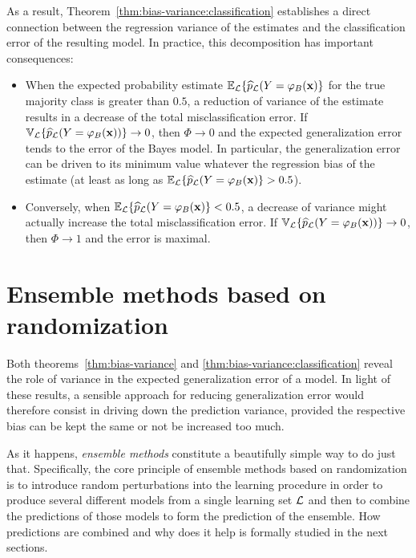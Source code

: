 As a result, Theorem~\ref{thm:bias-variance:classification} establishes a
direct connection between the regression variance of the estimates and the
classification error of the resulting model. In practice, this decomposition
has important consequences:
\begin{itemize}
\item When the expected probability estimate $\mathbb{E}_{\cal L}\{ \widehat{p}_{\cal L}(Y=\varphi_B(\mathbf{x}) \}$
      for the true majority class is greater than $0.5$, a reduction of
      variance of the estimate results in a decrease of the total misclassification
      error. If $\mathbb{V}_{\cal L}\{ \widehat{p}_{\cal L}(Y=\varphi_B(\mathbf{x})) \} \to 0$,
      then $\Phi \to 0$ and the expected generalization error tends to the error of the Bayes model.
      In particular, the generalization error can be driven to its minimum
      value whatever the regression bias of the estimate (at least as long as $\mathbb{E}_{\cal L}\{ \widehat{p}_{\cal L}(Y=\varphi_B(\mathbf{x}) \} > 0.5$).
\item Conversely, when $\mathbb{E}_{\cal L}\{ \widehat{p}_{\cal L}(Y=\varphi_B(\mathbf{x}) \} < 0.5$,
      a decrease of variance might actually increase the total misclassification error.
      If $\mathbb{V}_{\cal L}\{ \widehat{p}_{\cal L}(Y=\varphi_B(\mathbf{x})) \} \to 0$,
      then $\Phi \to 1$ and the error is maximal.
\end{itemize}


\section{Ensemble methods based on randomization}
\label{sec:4:ensemble}

Both theorems~\ref{thm:bias-variance} and \ref{thm:bias-variance:classification}
reveal the role of variance in the expected generalization error of a model. In
light of these results, a sensible approach for reducing generalization error
would therefore consist in driving down the prediction variance, provided the
respective bias can be kept the same or not be increased too much.

As it happens, \textit{ensemble methods} constitute a beautifully simple way to
do just that. Specifically, the core principle of ensemble methods based on randomization is to
introduce random perturbations into the learning procedure in order to produce
several different models from a single learning set ${\cal L}$ and then to
combine the predictions of those models to form the prediction of the ensemble.
How predictions are combined and why does it help is formally studied in the
next sections.


